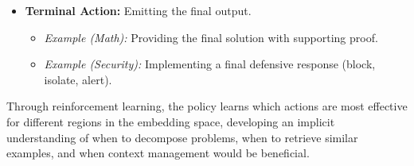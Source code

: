 \documentclass[10pt,journal,compsoc]{IEEEtran}
\begin{document}
\begin{itemize}
\begin{itemize}
  \item
    \textbf{Terminal Action:} Emitting the final output.
    \begin{itemize}
    \item \textit{Example (Math):} Providing the final solution with supporting proof.
    \item \textit{Example (Security):} Implementing a final defensive response (block, isolate, alert).
    \end{itemize}
  \end{itemize}
\end{itemize}

Through reinforcement learning, the policy learns which actions are most effective for different regions in the embedding space, developing an implicit understanding of when to decompose problems, when to retrieve similar examples, and when context management would be beneficial.
\end{document}
